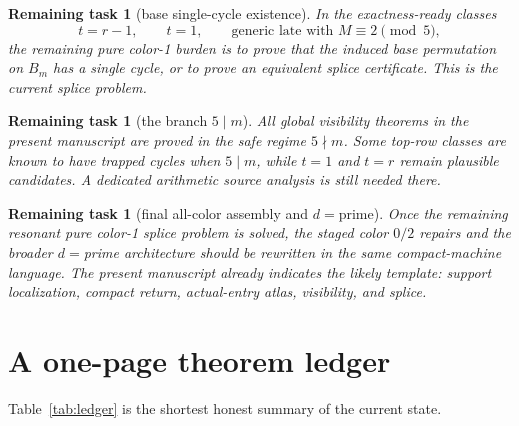 \documentclass[11pt]{article}
\newtheorem{openproblem}[theorem]{Remaining task}
\newcommand{\1}{\mathbf 1}
\newcommand{\Bm}{B_m}
\begin{document}
\begin{openproblem}[base single-cycle existence]
In the exactness-ready classes
\[
t=r-1,\qquad t=1,\qquad \text{generic late with }M\equiv 2 \pmod 5,
\]
the remaining pure color-1 burden is to prove that the induced base permutation on \(\Bm\) has a single cycle, or to prove an equivalent splice certificate.
This is the current splice problem.
\end{openproblem}

\begin{openproblem}[the branch \(5\mid m\)]
All global visibility theorems in the present manuscript are proved in the safe regime \(5\nmid m\).
Some top-row classes are known to have trapped cycles when \(5\mid m\), while \(t=1\) and \(t=r\) remain plausible candidates.
A dedicated arithmetic source analysis is still needed there.
\end{openproblem}

\begin{openproblem}[final all-color assembly and \(d=\)prime]
Once the remaining resonant pure color-1 splice problem is solved, the staged color \(0/2\) repairs and the broader \(d=\)prime architecture should be rewritten in the same compact-machine language.
The present manuscript already indicates the likely template:
support localization, compact return, actual-entry atlas, visibility, and splice.
\end{openproblem}

\section{A one-page theorem ledger}

Table~\ref{tab:ledger} is the shortest honest summary of the current state.
\end{document}
